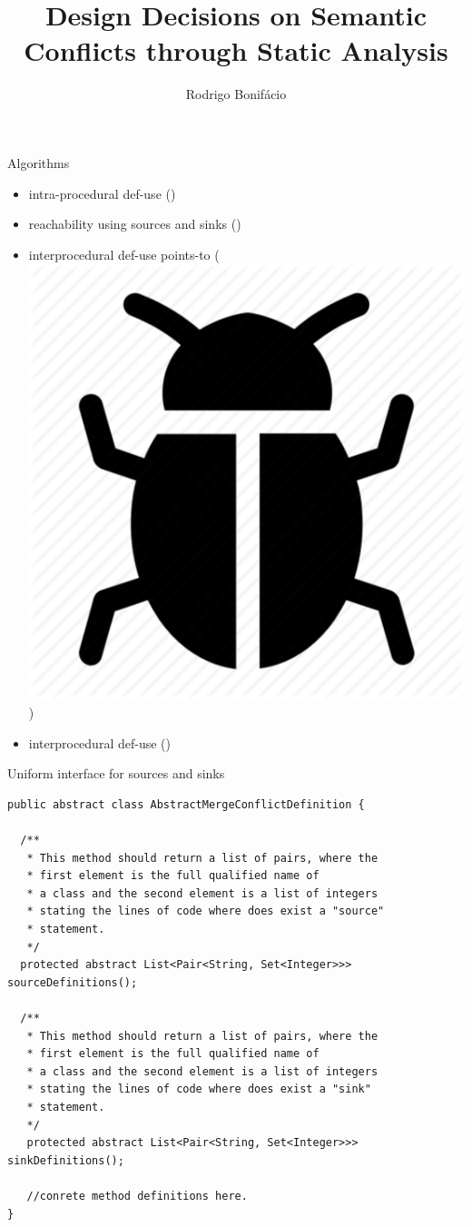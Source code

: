 \documentclass{beamer}
\title{Design Decisions on Semantic Conflicts through Static Analysis}
\author{Rodrigo Bonif\'{a}cio}
\newcommand{\xmark}{\ding{55}}%
\newcommand{\bug}{%
  \begingroup\normalfont
  \includegraphics[height=\fontcharht\font`\B]{images/bug.pdf}%
  \endgroup
}
\begin{document}
\begin{frame}
\titlepage
\end{frame}

\begin{frame}
  \begin{block}{Algorithms}
    \begin{itemize}
     \item intra-procedural def-use (\checkmark)
     \item reachability using sources and sinks (\checkmark)  
     \item interprocedural def-use points-to (\bug)
     \item interprocedural def-use (\xmark)
    \end{itemize}
  \end{block}
\end{frame}

\begin{frame}
  \Huge{Uniform interface for sources and sinks}
\end{frame}

\begin{frame}[fragile]
  \begin{lstlisting}
public abstract class AbstractMergeConflictDefinition {

  /**
   * This method should return a list of pairs, where the
   * first element is the full qualified name of
   * a class and the second element is a list of integers
   * stating the lines of code where does exist a "source"
   * statement.
   */
  protected abstract List<Pair<String, Set<Integer>>> sourceDefinitions();

  /**
   * This method should return a list of pairs, where the
   * first element is the full qualified name of
   * a class and the second element is a list of integers
   * stating the lines of code where does exist a "sink"
   * statement.
   */
   protected abstract List<Pair<String, Set<Integer>>> sinkDefinitions();

   //conrete method definitions here. 
}
  \end{lstlisting}

\end{frame}
\end{document}
